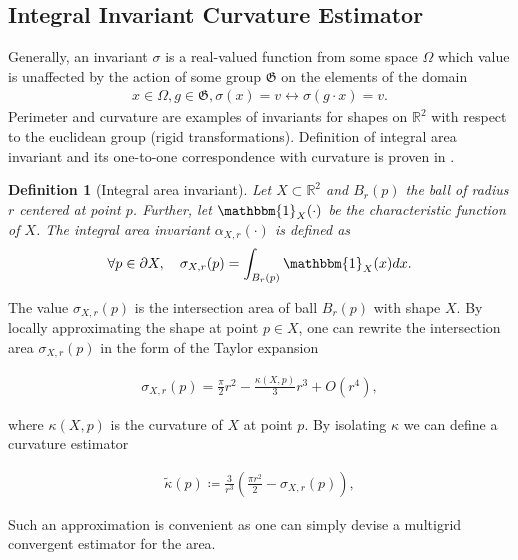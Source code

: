 \documentclass[runningheads]{llncs}
\newtheorem{ddef}{Definition}
\begin{document}
\subsection{Integral Invariant Curvature Estimator}
Generally, an invariant $\sigma$ is a real-valued function from some space $\Omega$ which value is unaffected by the action
of some group $\mathfrak{G}$ on the elements of the domain
\begin{align*}
  x \in \Omega, g \in \mathfrak{G}, \sigma(x) = v \longleftrightarrow \sigma(g \cdot x ) = v.
\end{align*}
Perimeter and curvature are examples of invariants for shapes on $\mathbb{R}^2$ with respect to the euclidean group
(rigid transformations). Definition of integral area invariant and its one-to-one correspondence with curvature is
proven in \cite{manay04}.


\begin{ddef}[Integral area invariant]
  Let $X \subset \mathbb{R}^2$ and $B_r(p)$ the ball of radius $r$ centered at point $p$. Further, let
  $\mathbbm{1}_X(\cdot)$ be the characteristic function of $X$. The integral area invariant $\alpha_{X,r}(\cdot)$ is
  defined as
  \begin{align*}
    \forall p \in \partial X, \quad \sigma_{X,r}(p) = \int_{B_r(p)}{ \mathbbm{1}_X(x) dx}.
  \end{align*}
\end{ddef}


The value $\sigma_{X,r}(p)$ is the intersection area of ball $B_r(p)$ with shape $X$. By locally approximating the shape
at point $p \in X$, one can rewrite the intersection area $\sigma_{X,r}(p)$ in the form of the Taylor expansion
\cite{pottman09}
	
\begin{align*}
  \sigma_{X,r}(p) = \frac{\pi}{2}r^2 - \frac{\kappa(X,p)}{3}r^3 + O(r^4),
\end{align*}
		
where $\kappa(X,p)$ is the curvature of $X$ at point $p$. By isolating $\kappa$ we can define a curvature estimator
	
\begin{align}
  \tilde{\kappa}(p) \coloneqq \frac{3}{r^3}\left( \frac{\pi r^2}{2} - \sigma_{X,r}(p) \right),
  \label{eq:curvature_approximation}
\end{align}
	
Such an approximation is convenient as one can simply devise a multigrid convergent estimator for the area.
\end{document}
